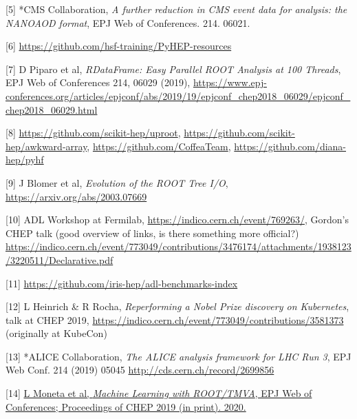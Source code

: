 \documentclass[11pt,a4paper]{article}
\begin{document}
{[}5{]} *CMS Collaboration, \emph{A further reduction in CMS event data
for analysis: the NANOAOD format}, EPJ Web of Conferences. 214. 06021.

{[}6{]}
\href{https://github.com/hsf-training/PyHEP-resources}{{https://github.com/hsf-training/PyHEP-resources}}

{[}7{]} D Piparo et al, \emph{RDataFrame: Easy Parallel ROOT Analysis at
100 Threads}, EPJ Web of Conferences 214, 06029 (2019),
\href{https://www.epj-conferences.org/articles/epjconf/abs/2019/19/epjconf_chep2018_06029/epjconf_chep2018_06029.html}{{https://www.epj-conferences.org/articles/epjconf/abs/2019/19/epjconf\_chep2018\_06029/epjconf\_chep2018\_06029.html}}

{[}8{]}
\href{https://github.com/scikit-hep/uproot}{{https://github.com/scikit-hep/uproot}},
\href{https://github.com/scikit-hep/awkward-array}{{https://github.com/scikit-hep/awkward-array}},
\href{https://github.com/CoffeaTeam}{{https://github.com/CoffeaTeam}},
\href{https://github.com/diana-hep/pyhf}{{https://github.com/diana-hep/pyhf}}

{[}9{]} J Blomer et al, \emph{Evolution of the ROOT Tree I/O},
\href{https://arxiv.org/abs/2003.07669}{{https://arxiv.org/abs/2003.07669}}

{[}10{]} ADL Workshop at Fermilab,
\href{https://indico.cern.ch/event/769263/timetable/?view=standard}{{https://indico.cern.ch/event/769263/}},
Gordon's CHEP talk (good overview of links, is there something more
official?)
\href{https://indico.cern.ch/event/773049/contributions/3476174/attachments/1938123/3220511/Declarative.pdf}{{https://indico.cern.ch/event/773049/contributions/3476174/attachments/1938123/3220511/Declarative.pdf}}

{[}11{]}
\href{https://github.com/iris-hep/adl-benchmarks-index}{{https://github.com/iris-hep/adl-benchmarks-index}}

{[}12{]} L Heinrich \& R Rocha, \emph{Reperforming a Nobel Prize
discovery on Kubernetes}, talk at CHEP 2019,
\href{https://indico.cern.ch/event/773049/contributions/3581373}{{https://indico.cern.ch/event/773049/contributions/3581373}}
(originally at KubeCon)

{[}13{]} *ALICE Collaboration, \emph{The ALICE analysis framework for
LHC Run 3}, EPJ Web Conf. 214 (2019) 05045
\href{http://cds.cern.ch/record/2699856}{{http://cds.cern.ch/record/2699856}}

{[}14{]} \href{http://paperpile.com/b/2mqsuS/IDej}{L Moneta et al,
\emph{Machine Learning with ROOT/TMVA}, EPJ Web of Conferences;
Proceedings of CHEP 2019 (in print). 2020.}
\end{document}
